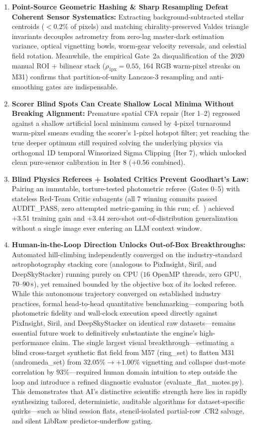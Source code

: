 \documentclass[10pt,twocolumn,letterpaper]{article}
\DeclareRobustCommand{\code}[1]{\texttt{#1}}
\def\code#1{#1}%
\begin{document}
\begin{enumerate}
  \item \textbf{Point-Source Geometric Hashing \& Sharp Resampling Defeat Coherent Sensor Systematics:} Extracting background-subtracted stellar centroids ($<0.2\%$ of pixels) and matching chirality-preserved Valdes triangle invariants decouples astrometry from zero-lag master-dark estimation variance, optical vignetting bowls, worm-gear velocity reversals, and celestial field rotation. Meanwhile, the empirical Gate~2a disqualification of the 2020 manual ROI + bilinear stack ($\rho_{1\text{px}} = 0.55$, \code{164} RGB warm-pixel streaks on M31) confirms that partition-of-unity Lanczos-3 resampling and anti-smoothing gates are indispensable.
  \item \textbf{Scorer Blind Spots Can Create Shallow Local Minima Without Breaking Alignment:} Premature spatial CFA repair (\code{Iter 1--2}) regressed against a shallow artificial local minimum caused by 4-pixel turnaround warm-pixel smears evading the scorer's 1-pixel hotspot filter; yet reaching the true deeper optimum still required solving the underlying physics via orthogonal 1D temporal Winsorized Sigma Clipping (\code{Iter 7}), which unlocked clean pure-sensor calibration in \code{Iter 8} (\code{+0.56} combined).
  \item \textbf{Blind Physics Referees + Isolated Critics Prevent Goodhart's Law:} Pairing an immutable, torture-tested photometric referee (\code{Gates 0--5}) with stateless Red-Team Critic subagents (all 7 winning commits passed \code{AUDIT\_PASS}, zero attempted metric-gaming in this run; cf.~\cite{krakovna2020specification,skalse2022defining}) achieved \code{+3.51} training gain and \code{+3.44} zero-shot out-of-distribution generalization without a single image ever entering an LLM context window.
  \item \textbf{Human-in-the-Loop Direction Unlocks Out-of-Box Breakthroughs:} Automated hill-climbing independently converged on the industry-standard astrophotography stacking core (analogous to PixInsight, Siril, and DeepSkyStacker) running purely on CPU ($16$ OpenMP threads, zero GPU, $70\text{--}90\text{\,s}$), yet remained bounded by the objective box of its locked referee. While this autonomous trajectory converged on established industry practices, formal head-to-head quantitative benchmarking---comparing both photometric fidelity and wall-clock execution speed directly against PixInsight, Siril, and DeepSkyStacker on identical raw datasets---remains essential future work to definitively substantiate the engine's high-performance claim. The single largest visual breakthrough---estimating a blind cross-target synthetic flat field from M57 (\code{ring\_set}) to flatten M31 (\code{andromeda\_set}) from $32.05\% \to +1.00\%$ vignetting and collapse dust-mote correlation by $93\%$---required human domain intuition to step outside the loop and introduce a refined diagnostic evaluator (\code{evaluate\_flat\_motes.py}). This demonstrates that AI's distinctive scientific strength here lies in rapidly synthesizing tailored, deterministic, auditable algorithms for dataset-specific quirks---such as blind session flats, stencil-isolated partial-row \code{.CR2} salvage, and silent \code{LibRaw} predictor-underflow gating.

\end{enumerate}
\end{document}
